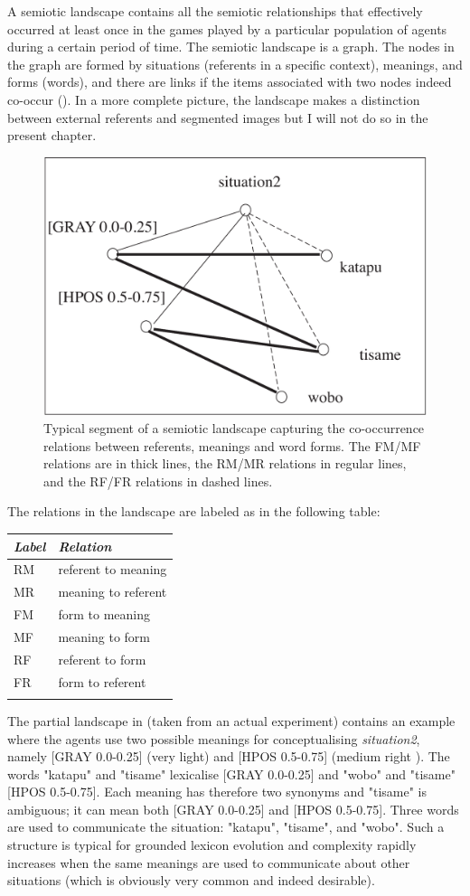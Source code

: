 A semiotic landscape contains all the semiotic relationships
that effectively occurred at least once
in the games played by a particular population of agents
during a certain period of time. 
The semiotic landscape is a graph. The nodes in the
graph are formed by situations (referents in a specific context), 
meanings, and forms (words),
and there are links if the items associated with two nodes
indeed co-occur (). In a more complete
picture, the landscape makes a distinction between 
external referents and segmented images but I will not 
do so in the present chapter. 
\begin{figure}[htbp]
  \centerline{\includegraphics[width=.65\textwidth]{chap7/figs/landscape}}
\caption{ \label{RMF1} Typical segment of a semiotic
landscape capturing the co-occurrence relations between
referents, meanings and word forms. The FM/MF relations are
in thick lines, the RM/MR relations in regular lines, and 
the RF/FR relations in dashed lines.}
\end{figure}
The relations in the landscape are labeled as in 
the following table:
\begin{center}
\begin{tabular}{ l  l  }
\lsptoprule
{\itshape Label}& {\itshape Relation } \\ \midrule
RM & referent to meaning \\ 
MR & meaning to referent \\ 
FM & form to meaning\\ 
MF & meaning to form\\ 
RF & referent to form \\ 
FR & form to referent  \\ 
\lspbottomrule
\end{tabular}
\end{center}

The partial landscape in  (taken from
an actual experiment) contains an example where the agents use
two possible meanings for conceptualising {\itshape situation2}, namely
[GRAY 0.0-0.25] (very light) and [HPOS 0.5-0.75]
(medium right ). The words "katapu" and "tisame" lexicalise
[GRAY 0.0-0.25] and "wobo" and "tisame" [HPOS 0.5-0.75]. 
Each meaning has therefore two synonyms and "tisame" is 
ambiguous; it can mean both [GRAY 0.0-0.25]
and [HPOS 0.5-0.75]. Three words
are used to communicate the situation: "katapu", "tisame", 
and "wobo". Such a structure is typical for grounded
lexicon evolution and complexity rapidly increases when the
same meanings are used to communicate about other
situations (which is obviously very common and indeed desirable). 

